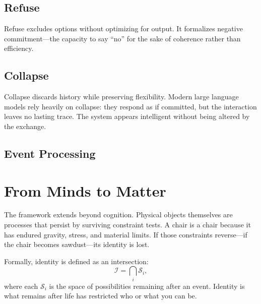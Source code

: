\documentclass[11pt]{article}
\begin{document}
\subsection{Refuse}

Refuse excludes options without optimizing for output. It formalizes negative commitment—the capacity to say \enquote{no} for the sake of coherence rather than efficiency.

\subsection{Collapse}

Collapse discards history while preserving flexibility. Modern large language models rely heavily on collapse: they respond as if committed, but the interaction leaves no lasting trace. The system appears intelligent without being altered by the exchange.

\subsection*{Event Processing}

\begin{center}
\end{center}

\section{From Minds to Matter}

The framework extends beyond cognition. Physical objects themselves are processes that persist by surviving constraint tests. A chair is a chair because it has endured gravity, stress, and material limits. If those constraints reverse—if the chair becomes sawdust—its identity is lost.

Formally, identity is defined as an intersection:
\[
\mathcal{I} = \bigcap_i \mathcal{S}_i,
\]
where each \(\mathcal{S}_i\) is the space of possibilities remaining after an event. Identity is what remains after life has restricted who or what you can be.
\end{document}
